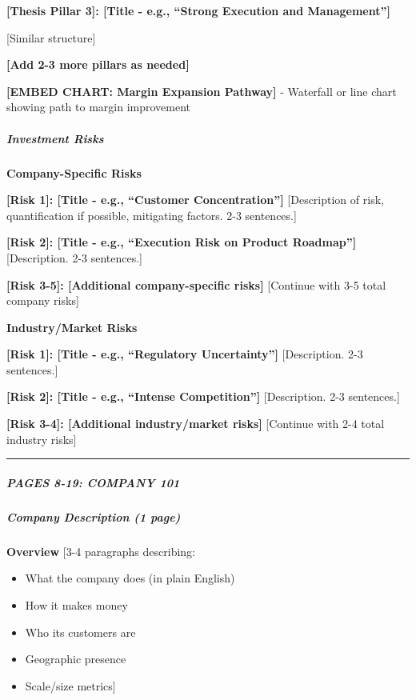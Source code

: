 \documentclass[11pt]{article}
\begin{document}
\textbf{[Thesis Pillar 3]: [Title - e.g., ``Strong Execution and Management'']}


[Similar structure]


\textbf{[Add 2-3 more pillars as needed]}


\textbf{[EMBED CHART: Margin Expansion Pathway]} - Waterfall or line chart showing path to margin improvement


\subparagraph{Investment Risks}\mbox{}\par

\textbf{Company-Specific Risks}


\textbf{[Risk 1]: [Title - e.g., ``Customer Concentration'']} [Description of risk, quantification if possible, mitigating factors. 2-3 sentences.]


\textbf{[Risk 2]: [Title - e.g., ``Execution Risk on Product Roadmap'']} [Description. 2-3 sentences.]


\textbf{[Risk 3-5]: [Additional company-specific risks]} [Continue with 3-5 total company risks]


\textbf{Industry/Market Risks}


\textbf{[Risk 1]: [Title - e.g., ``Regulatory Uncertainty'']} [Description. 2-3 sentences.]


\textbf{[Risk 2]: [Title - e.g., ``Intense Competition'']} [Description. 2-3 sentences.]


\textbf{[Risk 3-4]: [Additional industry/market risks]} [Continue with 2-4 total industry risks]


\vspace{0.5em}\hrule\vspace{0.5em}

\subparagraph{PAGES 8-19: COMPANY 101}\mbox{}\par

\subparagraph{Company Description (1 page)}\mbox{}\par

\textbf{Overview} [3-4 paragraphs describing:

\begin{itemize}[leftmargin=*,itemsep=2pt,topsep=2pt]
\item {} What the company does (in plain English)
\item {} How it makes money
\item {} Who its customers are
\item {} Geographic presence
\item {} Scale/size metrics]
\end{itemize}
\end{document}
